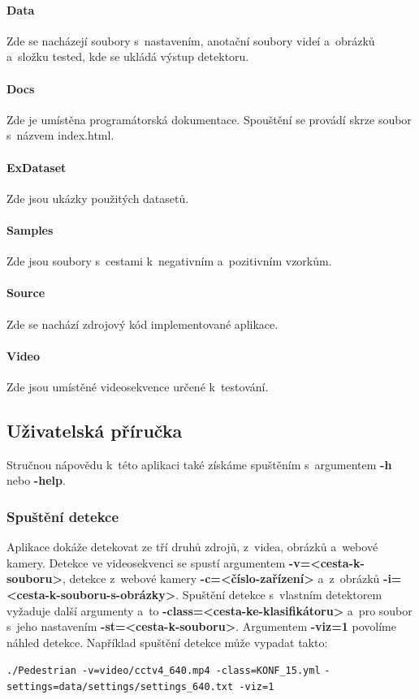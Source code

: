 \paragraph*{Data}
Zde se nacházejí soubory s~nastavením, anotační soubory videí a~obrázků a~složku tested, kde se ukládá výstup detektoru.
\paragraph*{Docs}
Zde je umístěna programátorská dokumentace. Spouštění se provádí skrze soubor s~názvem index.html.
\paragraph*{ExDataset}
Zde jsou ukázky použitých datasetů.
\paragraph*{Samples}
Zde jsou soubory s~cestami k~negativním a~pozitivním vzorkům.
\paragraph*{Source}
Zde se nachází zdrojový kód implementované aplikace.
\paragraph*{Video}
Zde jsou umístěné videosekvence určené k~testování.

\subsection*{Uživatelská příručka}
\label{manual}
Stručnou nápovědu k~této aplikaci také získáme spuštěním s~argumentem \textbf{-h} nebo \textbf{-help}.
\subsubsection*{Spuštění detekce}
Aplikace dokáže detekovat ze tří druhů zdrojů, z~videa, obrázků a~webové kamery. Detekce ve videosekvenci se spustí argumentem \textbf{-v=<cesta-k-souboru>}, detekce z~webové kamery \textbf{-c=<číslo-zařízení>} a~z~obrázků \textbf{-i=<cesta-k-souboru-s-obrázky>}. Spuštění detekce s~vlastním detektorem vyžaduje další argumenty a~to \textbf{-class=<cesta-ke-klasifikátoru>} a~pro soubor s~jeho nastavením \textbf{-st=<cesta-k-souboru>}. Argumentem \textbf{-viz=1} povolíme náhled detekce.  Například spuštění detekce může vypadat takto: 
\begin{center}
\verb|./Pedestrian -v=video/cctv4_640.mp4 -class=KONF_15.yml| 
\verb|-settings=data/settings/settings_640.txt -viz=1|
\end{center}
